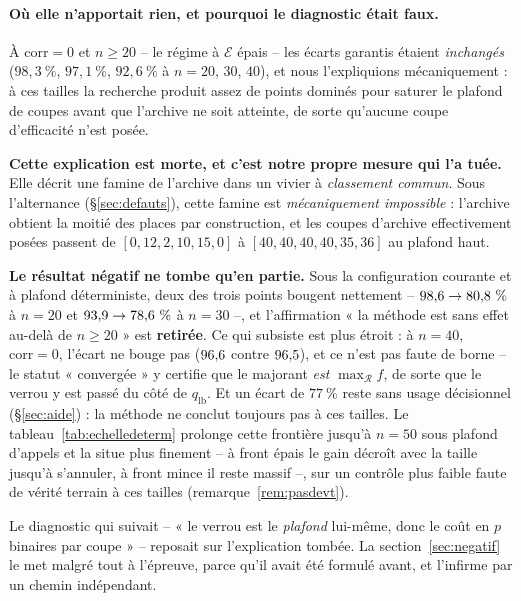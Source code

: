 \documentclass[11pt,a4paper]{article}
\theoremstyle{plain}
\theoremstyle{remark}
\newcommand{\Ecal}{\mathcal{E}}
\newcommand{\Rcal}{\mathcal{R}}
\begin{document}
\paragraph{Où elle n'apportait rien, et pourquoi le diagnostic était faux.}
À $\text{corr}=0$ et $n\ge 20$ -- le régime à $\Ecal$ épais -- les écarts
garantis étaient \emph{inchangés} ($98{,}3\ \%$, $97{,}1\ \%$, $92{,}6\ \%$
à $n=20$, $30$, $40$), et nous l'expliquions mécaniquement : à ces tailles la
recherche produit assez de points dominés pour saturer le plafond de coupes
avant que l'archive ne soit atteinte, de sorte qu'aucune coupe d'efficacité
n'est posée.

\textbf{Cette explication est morte, et c'est notre propre mesure qui l'a
tuée.} Elle décrit une famine de l'archive dans un vivier à \emph{classement
commun}. Sous l'alternance (§\ref{sec:defauts}), cette famine est
\emph{mécaniquement impossible} : l'archive obtient la moitié des places par
construction, et les coupes d'archive effectivement posées passent de
$[0,12,2,10,15,0]$ à $[40,40,40,40,35,36]$ au plafond haut.

\textbf{Le résultat négatif ne tombe qu'en partie.} Sous la configuration
courante et à plafond déterministe, deux des trois points bougent nettement
-- $98{,}6{}\to 80{,}8{}\ \%$ à $n=20$ et $93{,}9{}\to 78{,}6{}\ \%$ à $n=30$ --,
et l'affirmation « la méthode est sans effet au-delà de $n\ge 20$ » est
\textbf{retirée}. Ce qui subsiste est plus étroit : à $n=40$,
$\text{corr}=0$, l'écart ne bouge pas ($96{,}6{}$ contre $96{,}5{}$), et ce n'est
pas faute de borne -- le statut « convergée » y certifie que le majorant
\emph{est} $\max_{\Rcal}f$, de sorte que le verrou y est passé du côté de
$q_{\text{lb}}$. Et un écart de $77\ \%$ reste sans usage décisionnel
(§\ref{sec:aide}) : la méthode ne conclut toujours pas à ces tailles. Le
tableau~\ref{tab:echelledeterm} prolonge cette frontière jusqu'à $n=50$ sous
plafond d'appels et la situe plus finement -- à front épais le gain décroît
avec la taille jusqu'à s'annuler, à front mince il reste massif --, sur un
contrôle plus faible faute de vérité terrain à ces tailles
(remarque~\ref{rem:pasdevt}).

Le diagnostic qui suivait -- « le verrou est le \emph{plafond} lui-même,
donc le coût en $p$ binaires par coupe » -- reposait sur l'explication
tombée. La section~\ref{sec:negatif} le met malgré tout à l'épreuve, parce
qu'il avait été formulé avant, et l'infirme par un chemin indépendant.
\end{document}
